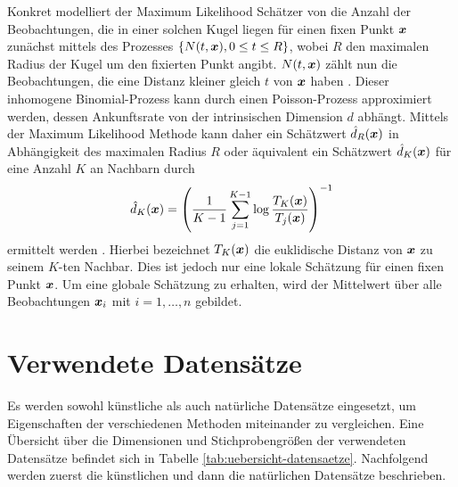Konkret modelliert der Maximum Likelihood Schätzer von \textcite{Levina.2004} die Anzahl der
Beobachtungen, die in einer solchen Kugel liegen für einen fixen Punkt $\bm{x}$ zunächst mittels
des Prozesses $\{ N(t, \bm{x}), 0 \leq t \leq R \}$, wobei $R$ den maximalen Radius der Kugel um
den fixierten Punkt angibt. $N(t, \bm{x})$ zählt nun die Beobachtungen, die eine Distanz kleiner
gleich $t$ von $\bm{x}$ haben \parencite[3]{Levina.2004}. Dieser inhomogene Binomial-Prozess kann durch einen Poisson-Prozess
approximiert werden, dessen Ankunftsrate von der intrinsischen Dimension $d$ abhängt. Mittels der
Maximum Likelihood Methode kann daher ein Schätzwert $\hat{d}_R(\bm{x})$ in Abhängigkeit
des maximalen Radius $R$ oder äquivalent ein Schätzwert $\hat{d}_K(\bm{x})$ für eine Anzahl
$K$ an Nachbarn durch
\begin{equation}
	\hat{d}_K(\bm{x}) = \left( \frac{1}{K - 1} \sum_{j=1}^{K - 1} \log \frac{T_K(\bm{x})}{T_j(\bm{x})} \right)^{-1}
\end{equation}
ermittelt werden \parencite[3 -- 4]{Levina.2004}. Hierbei bezeichnet $T_{K}(\bm{x})$ die euklidische Distanz von
$\bm{x}$ zu seinem $K$-ten Nachbar. Dies ist jedoch nur eine lokale Schätzung für einen fixen
Punkt $\bm{x}$. Um eine globale Schätzung zu erhalten, wird der Mittelwert über alle
Beobachtungen $\bm{x}_i$ mit $i = 1, \ldots, n$ gebildet.
\section{Verwendete Datensätze}
\label{ch:Vergleich:sec:VerwendeteDatensaetze}
Es werden sowohl künstliche als auch natürliche Datensätze eingesetzt, um Eigenschaften der
verschiedenen Methoden miteinander zu vergleichen. Eine Übersicht über die Dimensionen und Stichprobengrößen der verwendeten Datensätze befindet sich in Tabelle \ref{tab:uebersicht-datensaetze}. Nachfolgend werden zuerst die künstlichen und dann die natürlichen Datensätze beschrieben.

